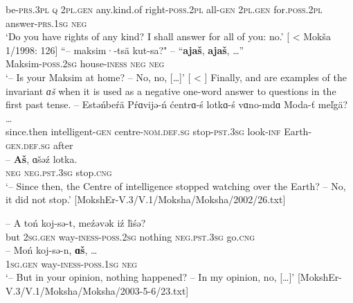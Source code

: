 \documentclass[output=paper]{langsci/langscibook}
\begin{document}
be-\textsc{prs.3pl} \textsc{q} 2\textsc{pl.gen} any.kind.of right-\textsc{poss.2pl} all-\textsc{gen} 2\textsc{pl.gen} for.\textsc{poss.2pl} answer-\textsc{prs.1sg} \textsc{neg}\\
\glt `Do you have rights of any kind? I shall answer for all of you: no.' [\citealt[270]{Hamari2007} < Mokša 1/1998: 126]
\z
\ea\label{ex:moksha-Maksim}
\gll ``-- maksim·-tsä kut-sa?" -- ``\textbf{ajaš}, \textbf{ajaš},
\ob\ldots\cb''\\
{} Maksim-\textsc{poss.2sg} house-\textsc{iness} {} \textsc{neg} \textsc{neg}\\
\glt `-- Is your Maksim at home? -- No, no, [\ldots]' [\citealt[270]{Hamari2007} < \citealt[894]{PaasonenRavila1947}]
\z
Finally,  and  are examples of the invariant \textit{ɑš} when it is used as a negative one-word answer to questions in the first past tense.
\ea\label{ex:moksha-intelligence}
\gll -- Estəńbeŕä Pŕɑvijə-ń ćentrɑ-ś lotkɑ-ś vɑno-mdɑ Moda-ť meľgä? \ob\ldots\cb\\
{} since.then intelligent-\textsc{gen} centre-\textsc{nom.def.sg} stop-\textsc{pst.3sg} look-\textsc{inf} Earth-\textsc{gen.def.sg} after {}\\
\sn
\gll -- \textbf{Aš}, ɑšəź lotka.\\
{} \textsc{neg} \textsc{neg.pst.3sg} stop.\textsc{cng}\\
\glt `-- Since then, the Centre of intelligence stopped watching over the Earth? -- No, it did not stop.' [MokshEr-V.3/V.1/Moksha/Moksha/2002/26.txt]
\z
\begin{exe}
\ex\label{ex:moksha-opinion}
\gll -- A toń koj-sə-t, meźəvək iź ľiśə?\\
{} but \textsc{2sg.gen} way-\textsc{iness-poss.2sg} nothing \textsc{neg.pst.3sg} go.\textsc{cng} \\
\sn
\gll -- Moń koj-sə-n, \textbf{ɑš}, \ob\ldots\cb\\
{} \textsc{1sg.gen} way-\textsc{iness-poss.1sg} \textsc{neg}\\
\glt `-- But in your opinion, nothing happened? -- In my opinion, no, [\ldots]' [MokshEr-V.3/V.1/Moksha/Moksha/2003-5-6/23.txt]
\end{exe}
\end{document}
